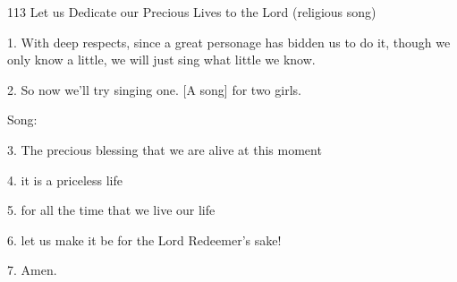
113 Let us Dedicate our Precious Lives to the Lord (religious song)

1. With deep respects, since a great personage has bidden us to do it, though we
only know a little, we will just sing what little we know.

2. So now we'll try singing one. [A song] for two girls.

Song:

3. The precious blessing that we are alive at this moment

4. it is a priceless life

5. for all the time that we live our life

6. let us make it be for the Lord Redeemer's sake!

7. Amen.


